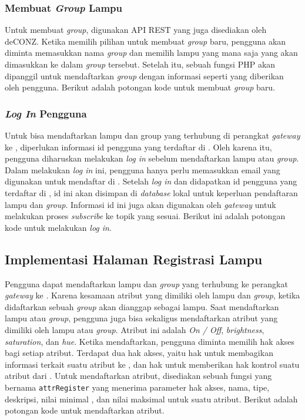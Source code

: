 

\subsubsection{Membuat \textit{Group} Lampu}
Untuk membuat \textit{group}, digunakan API REST yang juga disediakan oleh deCONZ. Ketika memilih pilihan untuk membuat \textit{group} baru, pengguna akan diminta memasukkan nama \textit{group} dan memilih lampu yang mana saja yang akan dimasukkan ke dalam \textit{group} tersebut. Setelah itu, sebuah fungsi PHP akan dipanggil untuk mendaftarkan \textit{group} dengan informasi seperti yang diberikan oleh pengguna. Berikut adalah potongan kode untuk membuat \textit{group} baru.



\subsubsection{\textit{Log In} Pengguna}
Untuk bisa mendaftarkan lampu dan group yang terhubung di perangkat \textit{gateway} ke \plat, diperlukan informasi id pengguna yang terdaftar di \plat. Oleh karena itu, pengguna diharuskan melakukan \textit{log in} sebelum mendaftarkan lampu atau \textit{group}. Dalam melakukan \textit{log in} ini, pengguna hanya perlu memasukkan email yang digunakan untuk mendaftar di \plat. Setelah \textit{log in} dan didapatkan id pengguna yang terdaftar di \plat, id ini akan disimpan di \textit{database} lokal untuk keperluan pendaftaran lampu dan \textit{group}. Informasi id ini juga akan digunakan oleh \textit{gateway} untuk melakukan proses \textit{subscribe} ke topik yang sesuai. Berikut ini adalah potongan kode untuk melakukan \textit{log in}.



\subsection{Implementasi Halaman Registrasi Lampu}
Pengguna dapat mendaftarkan lampu dan \textit{group} yang terhubung ke perangkat \textit{gateway} ke \plat. Karena kesamaan atribut yang dimiliki oleh lampu dan \textit{group}, ketika didaftarkan sebuah \textit{group} akan dianggap sebagai lampu. Saat mendaftarkan lampu atau \textit{group}, pengguna juga bisa sekaligus mendaftarkan atribut yang dimiliki oleh lampu atau \textit{group}. Atribut ini adalah \textit{On / Off}, \textit{brightness}, \textit{saturation}, dan \textit{hue}. Ketika mendaftarkan, pengguna diminta memilih hak akses bagi setiap atribut. Terdapat dua hak akses, yaitu hak untuk membagikan informasi terkait suatu atribut ke \plat, dan hak untuk memberikan hak kontrol suatu atribut dari \plat. Untuk mendaftarkan atribut, disediakan sebuah fungsi yang bernama \texttt{attrRegister} yang menerima parameter hak akses, nama, tipe, deskripsi, nilai minimal , dan nilai maksimal untuk suatu atribut. Berikut adalah potongan kode untuk mendaftarkan atribut.

